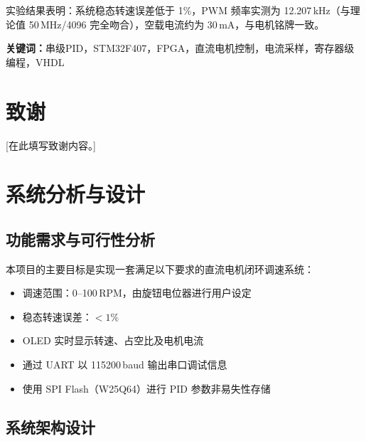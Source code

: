 \documentclass[12pt, a4paper]{ctexrep}
\begin{document}
实验结果表明：系统稳态转速误差低于 1\%，PWM 频率实测为 12.207\,kHz（与理论值 50\,MHz/4096 完全吻合），空载电流约为 30\,mA，与电机铭牌一致。

\vspace{1em}
\noindent\textbf{关键词：}串级PID，STM32F407，FPGA，直流电机控制，电流采样，寄存器级编程，VHDL

\chapter*{致谢}

[在此填写致谢内容。]

\tableofcontents
\listoftables
\listoffigures

\chapter{系统分析与设计}

\section{功能需求与可行性分析}

本项目的主要目标是实现一套满足以下要求的直流电机闭环调速系统：

\begin{itemize}
    \item 调速范围：0--100\,RPM，由旋钮电位器进行用户设定
    \item 稳态转速误差：$<1\%$
    \item OLED 实时显示转速、占空比及电机电流
    \item 通过 UART 以 115200\,baud 输出串口调试信息
    \item 使用 SPI Flash（W25Q64）进行 PID 参数非易失性存储
\end{itemize}

\section{系统架构设计}
\end{document}

